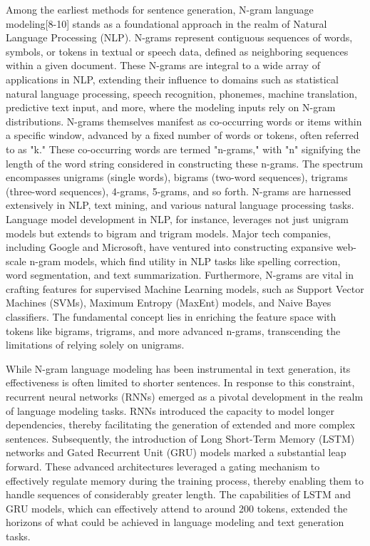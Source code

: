 \documentclass[conference]{IEEEtran}
\begin{document}
Among the earliest methods for sentence generation, N-gram language modeling[8-10] stands as a foundational approach in the realm of Natural Language Processing (NLP). N-grams represent contiguous sequences of words, symbols, or tokens in textual or speech data, defined as neighboring sequences within a given document. These N-grams are integral to a wide array of applications in NLP, extending their influence to domains such as statistical natural language processing, speech recognition, phonemes, machine translation, predictive text input, and more, where the modeling inputs rely on N-gram distributions. N-grams themselves manifest as co-occurring words or items within a specific window, advanced by a fixed number of words or tokens, often referred to as "k." These co-occurring words are termed "n-grams," with "n" signifying the length of the word string considered in constructing these n-grams. The spectrum encompasses unigrams (single words), bigrams (two-word sequences), trigrams (three-word sequences), 4-grams, 5-grams, and so forth. N-grams are harnessed extensively in NLP, text mining, and various natural language processing tasks. Language model development in NLP, for instance, leverages not just unigram models but extends to bigram and trigram models. Major tech companies, including Google and Microsoft, have ventured into constructing expansive web-scale n-gram models, which find utility in NLP tasks like spelling correction, word segmentation, and text summarization. Furthermore, N-grams are vital in crafting features for supervised Machine Learning models, such as Support Vector Machines (SVMs), Maximum Entropy (MaxEnt) models, and Naive Bayes classifiers. The fundamental concept lies in enriching the feature space with tokens like bigrams, trigrams, and more advanced n-grams, transcending the limitations of relying solely on unigrams.


While N-gram language modeling has been instrumental in text generation, its effectiveness is often limited to shorter sentences. In response to this constraint, recurrent neural networks (RNNs) emerged as a pivotal development in the realm of language modeling tasks. RNNs introduced the capacity to model longer dependencies, thereby facilitating the generation of extended and more complex sentences. Subsequently, the introduction of Long Short-Term Memory (LSTM) networks and Gated Recurrent Unit (GRU) models marked a substantial leap forward. These advanced architectures leveraged a gating mechanism to effectively regulate memory during the training process, thereby enabling them to handle sequences of considerably greater length. The capabilities of LSTM and GRU models, which can effectively attend to around 200 tokens, extended the horizons of what could be achieved in language modeling and text generation tasks.
\end{document}
